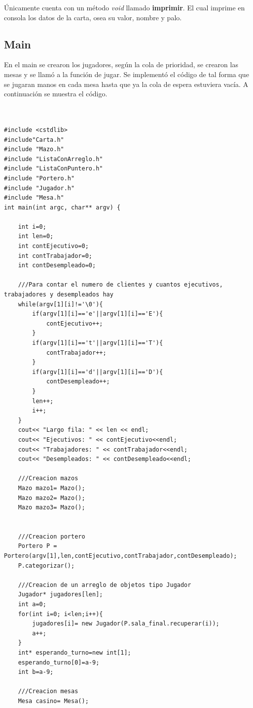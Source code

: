 \documentclass[11pt]{article}
\begin{document}
Únicamente cuenta con un método \textit{void} llamado \textbf{imprimir}. El cual imprime en consola los datos de la carta, osea su valor, nombre y palo. 

\newpage
\subsection{Main}
En el main se crearon los jugadores, según la cola de prioridad, se crearon las mesas y se llamó a la función de jugar. Se implementó el código de tal forma que se jugaran manos en cada mesa hasta que ya la cola de espera estuviera vacía. A continuación se muestra el código. 

\begin{lstlisting}


#include <cstdlib>
#include"Carta.h"
#include "Mazo.h"
#include "ListaConArreglo.h"
#include "ListaConPuntero.h"
#include "Portero.h"
#include "Jugador.h"
#include "Mesa.h"
int main(int argc, char** argv) {
    
    int i=0;
    int len=0;
    int contEjecutivo=0;
    int contTrabajador=0;
    int contDesempleado=0;
    
    ///Para contar el numero de clientes y cuantos ejecutivos, trabajadores y desempleados hay
    while(argv[1][i]!='\0'){
        if(argv[1][i]=='e'||argv[1][i]=='E'){
            contEjecutivo++;
        }
        if(argv[1][i]=='t'||argv[1][i]=='T'){
            contTrabajador++;
        }
        if(argv[1][i]=='d'||argv[1][i]=='D'){
            contDesempleado++;
        }
        len++;
        i++;
    }
    cout<< "Largo fila: " << len << endl;
    cout<< "Ejecutivos: " << contEjecutivo<<endl;
    cout<< "Trabajadores: " << contTrabajador<<endl;
    cout<< "Desempleados: " << contDesempleado<<endl;
    
    ///Creacion mazos
    Mazo mazo1= Mazo();
    Mazo mazo2= Mazo();
    Mazo mazo3= Mazo();
    
    
    ///Creacion portero
    Portero P = Portero(argv[1],len,contEjecutivo,contTrabajador,contDesempleado);
    P.categorizar();
    
    ///Creacion de un arreglo de objetos tipo Jugador
    Jugador* jugadores[len];
    int a=0;
    for(int i=0; i<len;i++){
        jugadores[i]= new Jugador(P.sala_final.recuperar(i));
        a++;
    }
    int* esperando_turno=new int[1];
    esperando_turno[0]=a-9;
    int b=a-9;
    
    ///Creacion mesas
    Mesa casino= Mesa();
    

\end{lstlisting}
\end{document}
